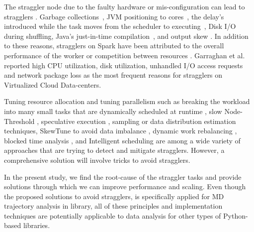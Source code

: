 The straggler node due to the faulty hardware or mis-configuration can lead to stragglers \cite{Dean2004}. 
Garbage collections~\cite{Kyong2017,Ousterhout2017}, JVM positioning to cores~\cite{Kyong2017}, the delay's introduced while the task moves from the scheduler to executing~\cite{Gittens2016}, Disk I/O during shuffling, Java's just-in-time compilation~\cite{Ousterhout2017}, and output skew \cite{Ousterhout2017}. 
In addition to these reasons, stragglers on Spark have been attributed to the overall performance of the worker or competition between resources \cite{Yang2016}.
Garraghan et al. \cite{Garraghan2016} reported high CPU utilization, disk utilization, unhandled I/O access requests and network package loss as the most frequent reasons for stragglers on Virtualized Cloud Data-centers.

Tuning resource allocation and tuning parallelism such as breaking the workload into many small tasks that are dynamically scheduled at runtime \cite{Rosen2012}, slow Node-Threshold \cite{Dean2004}, speculative execution \cite{Dean2004}, sampling or data distribution estimation techniques, SkewTune to avoid data imbalance \cite{Kwon2012}, dynamic work rebalancing \cite{Schmidt2016}, blocked time analysis \cite{Ousterhout2015}, and Intelligent scheduling \cite{AWE-WQ2014} are among a wide variety of approaches that are trying to detect and mitigate stragglers. 
However, a comprehensive solution will involve tricks to avoid stragglers. 

In the present study, we find the root-cause of the straggler tasks and provide solutions through which we can improve performance and scaling.
Even though the proposed solutions to avoid stragglers, is specifically applied for MD trajectory analysis in  library, all of these principles and implementation techniques are potentially applicable to data analysis for other types of Python-based libraries.


